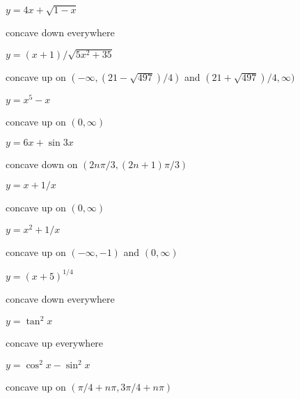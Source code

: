 \begin{exercises}
\begin{exercise} $y = 4x+\sqrt{1-x}$
\begin{answer} concave down everywhere
\end{answer}\end{exercise}

\begin{exercise} $y = (x+1)/\sqrt{5x^2 + 35}$
\begin{answer} concave up on $(-\infty,(21-\sqrt{497})/4)$ and 
$(21+\sqrt{497})/4,\infty)$
\end{answer}\end{exercise}

\begin{exercise} $y= x^5 - x$
\begin{answer} concave up on $(0,\infty)$
\end{answer}\end{exercise}

\begin{exercise} $y = 6x + \sin 3x$
\begin{answer} concave down on $(2n\pi/3,(2n+1)\pi/3)$
\end{answer}\end{exercise}

\begin{exercise} $y = x+ 1/x$
\begin{answer} concave up on $(0,\infty)$
\end{answer}\end{exercise}

\begin{exercise} $y = x^2+ 1/x$
\begin{answer} concave up on $(-\infty,-1)$ and $(0,\infty)$
\end{answer}\end{exercise}

\begin{exercise} $y = (x+5)^{1/4}$
\begin{answer} concave down everywhere
\end{answer}\end{exercise}

\begin{exercise} $y = \tan^2 x$
\begin{answer} concave up everywhere
\end{answer}\end{exercise}

\begin{exercise} $y =\cos^2 x - \sin^2 x$
\begin{answer} concave up on $(\pi/4+n\pi,3\pi/4+n\pi)$
\end{answer}\end{exercise}


\end{exercises}
